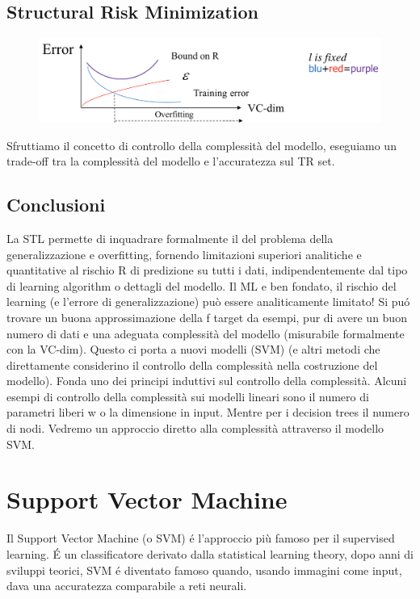 \documentclass{article}
\begin{document}
\subsection{Structural Risk Minimization}
\begin{figure}[H]
\centering
\includegraphics[scale=0.4]{Images/structuralriskmin.png}
\end{figure}
Sfruttiamo il concetto di controllo della complessità del modello, eseguiamo un trade-off tra la complessità del modello e l'accuratezza sul TR set.

\subsection{Conclusioni}
La STL permette di inquadrare formalmente il del problema della generalizzazione e overfitting, fornendo limitazioni superiori analitiche e quantitative al rischio R di predizione su tutti i dati, indipendentemente dal tipo di learning algorithm o dettagli del modello. Il ML e ben fondato, il rischio del learning (e l'errore di generalizzazione) può essere analiticamente limitato! Si puó trovare un buona approssimazione della f target da esempi, pur di avere un buon numero di dati e una adeguata complessità del modello (misurabile formalmente con la VC-dim). Questo ci porta a nuovi modelli (SVM) (e altri metodi che direttamente considerino il controllo della complessità nella costruzione del modello). Fonda uno dei principi induttivi sul controllo della complessità. \newline
Alcuni esempi di controllo della complessità sui modelli lineari sono il numero di parametri liberi w o la dimensione in input. Mentre per i decision trees il numero di nodi. Vedremo un approccio diretto alla complessità attraverso il modello SVM.

\section{Support Vector Machine}
Il Support Vector Machine (o SVM) é l'approccio più famoso per il supervised learning. É un classificatore derivato dalla statistical learning theory, dopo anni di sviluppi teorici, SVM é diventato famoso quando, usando immagini come input, dava una accuratezza comparabile a reti neurali.
\end{document}
